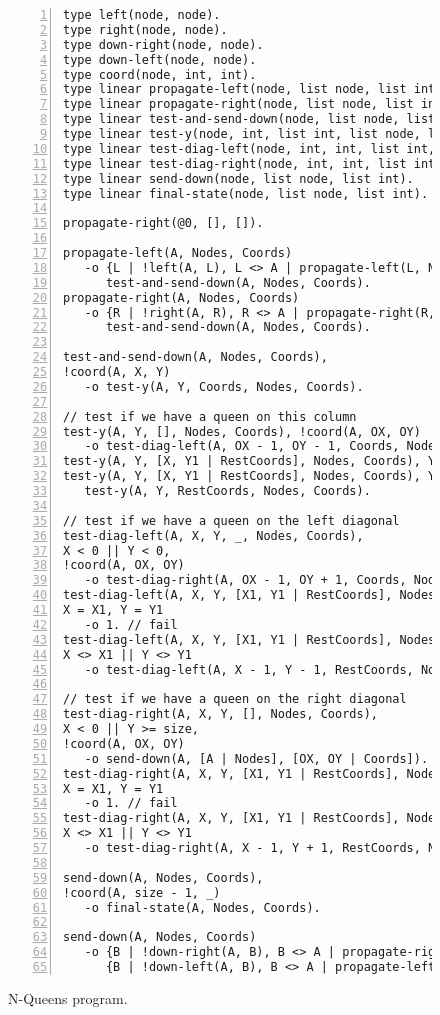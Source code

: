 \begin{figure}[h!]
\footnotesize\begin{Verbatim}[numbers=left]
type left(node, node).
type right(node, node).
type down-right(node, node).
type down-left(node, node).
type coord(node, int, int).
type linear propagate-left(node, list node, list int).
type linear propagate-right(node, list node, list int).
type linear test-and-send-down(node, list node, list int).
type linear test-y(node, int, list int, list node, list int).
type linear test-diag-left(node, int, int, list int, list node, list int).
type linear test-diag-right(node, int, int, list int, list node, list int).
type linear send-down(node, list node, list int).
type linear final-state(node, list node, list int).

propagate-right(@0, [], []).

propagate-left(A, Nodes, Coords)
   -o {L | !left(A, L), L <> A | propagate-left(L, Nodes, Coords)},
      test-and-send-down(A, Nodes, Coords).
propagate-right(A, Nodes, Coords)
   -o {R | !right(A, R), R <> A | propagate-right(R, Nodes, Coords)},
      test-and-send-down(A, Nodes, Coords).

test-and-send-down(A, Nodes, Coords),
!coord(A, X, Y)
   -o test-y(A, Y, Coords, Nodes, Coords).

// test if we have a queen on this column
test-y(A, Y, [], Nodes, Coords), !coord(A, OX, OY)
   -o test-diag-left(A, OX - 1, OY - 1, Coords, Nodes, Coords).
test-y(A, Y, [X, Y1 | RestCoords], Nodes, Coords), Y = Y1 -o 1. // fail
test-y(A, Y, [X, Y1 | RestCoords], Nodes, Coords), Y <> Y1 -o
   test-y(A, Y, RestCoords, Nodes, Coords).

// test if we have a queen on the left diagonal
test-diag-left(A, X, Y, _, Nodes, Coords),
X < 0 || Y < 0,
!coord(A, OX, OY)
   -o test-diag-right(A, OX - 1, OY + 1, Coords, Nodes, Coords).
test-diag-left(A, X, Y, [X1, Y1 | RestCoords], Nodes, Coords),
X = X1, Y = Y1
   -o 1. // fail
test-diag-left(A, X, Y, [X1, Y1 | RestCoords], Nodes, Coords),
X <> X1 || Y <> Y1
   -o test-diag-left(A, X - 1, Y - 1, RestCoords, Nodes, Coords).

// test if we have a queen on the right diagonal
test-diag-right(A, X, Y, [], Nodes, Coords),
X < 0 || Y >= size,
!coord(A, OX, OY)
   -o send-down(A, [A | Nodes], [OX, OY | Coords]). // add new queen
test-diag-right(A, X, Y, [X1, Y1 | RestCoords], Nodes, Coords),
X = X1, Y = Y1
   -o 1. // fail
test-diag-right(A, X, Y, [X1, Y1 | RestCoords], Nodes, Coords),
X <> X1 || Y <> Y1
   -o test-diag-right(A, X - 1, Y + 1, RestCoords, Nodes, Coords).

send-down(A, Nodes, Coords),
!coord(A, size - 1, _)
   -o final-state(A, Nodes, Coords).

send-down(A, Nodes, Coords)
   -o {B | !down-right(A, B), B <> A | propagate-right(B, Nodes, Coords)},
      {B | !down-left(A, B), B <> A | propagate-left(B, Nodes, Coords)}.
\end{Verbatim}
  \caption{N-Queens program.}
  \label{code:nqueens}
\end{figure}
\normalsize

